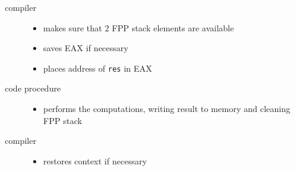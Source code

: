 \begin{description}
\item[compiler] \mbox{}
   \begin{itemize}
     \item makes sure that 2 FPP stack elements are available
     \item saves EAX if necessary
     \item places address of {\tt res} in EAX
   \end{itemize}
\item[code procedure] \mbox{}
   \begin{itemize}
   \item performs the computations, writing result to memory
         and cleaning FPP stack
   \end{itemize}
\item[compiler] \mbox{}
   \begin{itemize}
   \item restores context if necessary
   \end{itemize}
\end{description}
